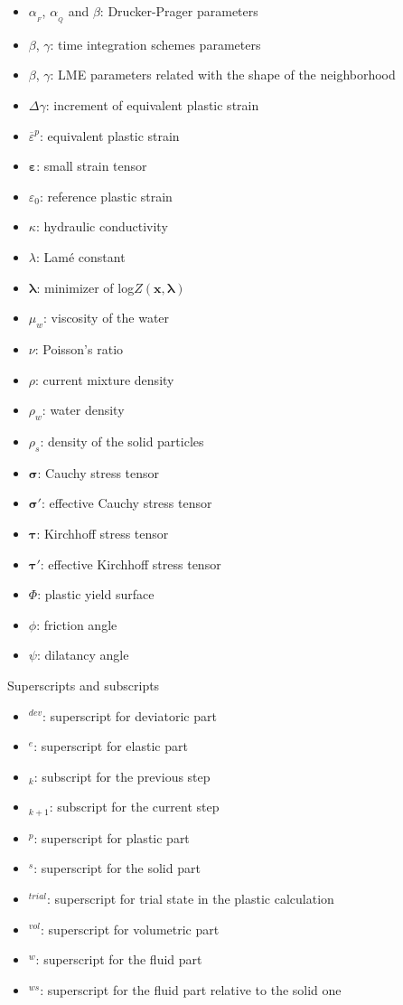 \documentclass[twocolumn]{svjour3}          %
\begin{document}
\begin{itemize}
\item $\alpha_{_F}$, $\alpha_{_Q}$ and $\beta$: Drucker-Prager parameters
\item $\beta$, $\gamma$: time integration schemes parameters
\item $\beta$, $\gamma$: LME parameters related with the shape of the neighborhood
\item $\Delta\gamma$: increment of equivalent plastic strain
\item $\overline{\varepsilon}^p$: equivalent plastic strain
\item $\boldsymbol{\varepsilon}$: small strain tensor
\item  $\varepsilon_0$: reference plastic strain
\item $\kappa$: hydraulic conductivity
\item $\lambda$: Lam\'e constant
\item $\boldsymbol{\lambda}$: minimizer of log$Z(\boldsymbol{x},\boldsymbol{\lambda})$
\item  $\mu_w $: viscosity of the water
\item $\nu$: Poisson's ratio
\item $\rho$: current mixture density
\item $\rho_w$: water density
\item $\rho_s$: density of the solid particles
\item $\boldsymbol{\sigma}$: Cauchy stress tensor
\item $\boldsymbol{\sigma'}$: effective Cauchy stress tensor
\item $\boldsymbol{\tau}$: Kirchhoff stress tensor
\item $\boldsymbol{\tau'}$: effective Kirchhoff stress tensor
\item $\Phi$: plastic yield surface
\item  $\phi$: friction angle
\item $\psi$: dilatancy angle
\\
\end{itemize}

Superscripts and subscripts
\begin{itemize}
\item$^{dev}$: superscript for deviatoric part
\item$^{e}$: superscript for elastic part
\item$_{k}$: subscript for the previous step
\item$_{k+1}$: subscript for the current step
\item$^{p}$: superscript for plastic part
\item$^{s}$: superscript for the solid part
\item$^{trial}$: superscript for trial state in the plastic calculation
\item$^{vol}$: superscript for volumetric part
\item$^{w}$: superscript for the fluid part
\item$^{ws}$: superscript for the fluid part relative to the solid one
\end{itemize}

\end{document}

